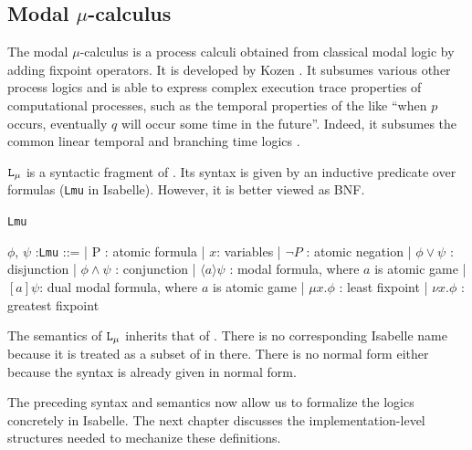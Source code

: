 \subsection{Modal \texorpdfstring{$\mu$}{}-calculus}
The modal $\mu$-calculus is a process calculi obtained from classical modal logic by adding fixpoint operators. It is developed by Kozen \cite{KOZEN1983333}. It subsumes various other process logics and is able to express complex execution trace properties of computational processes, such as the temporal properties of the like ``when $p$ occurs, eventually $q$ will occur some time in the future''. Indeed, it subsumes the common linear temporal and branching time logics \cite{Emerson1986EfficientMC}.  

$\texttt{L}_\mu{}$ is a syntactic fragment of \FLC{}. Its syntax is given by an inductive predicate over \FLC{} formulas (\texttt{Lmu} in Isabelle). However, it is better viewed as BNF.

\begin{center}
\begin{bdefinition}
\texttt{Lmu}

    \begin {bnf}
        $\phi$, $\psi$ :\texttt{Lmu} ::=
        | P : atomic formula
        | $x$: variables
        | $\neg P$ : atomic negation
        | $\phi \vee\psi$ : disjunction
        | $\phi \wedge \psi$ : conjunction
        | $\langle a \rangle \psi$ : modal formula, where $a$ is atomic game
        | $[a] \psi$: dual modal formula, where $a$ is atomic game
        | $\mu x. \phi$ : least fixpoint
        | $\nu x. \phi$ : greatest fixpoint
    \end{bnf}
\end{bdefinition}
\end{center}

The semantics of $\texttt{L}_\mu{}$ inherits that of \FLC{}. There is no corresponding Isabelle name because it is treated as a subset of \FLC{} in there. There is no normal form either because the syntax is already given in normal form.

The preceding syntax and semantics now allow us to formalize the logics concretely in Isabelle. The next chapter discusses the implementation-level structures needed to mechanize these definitions.

